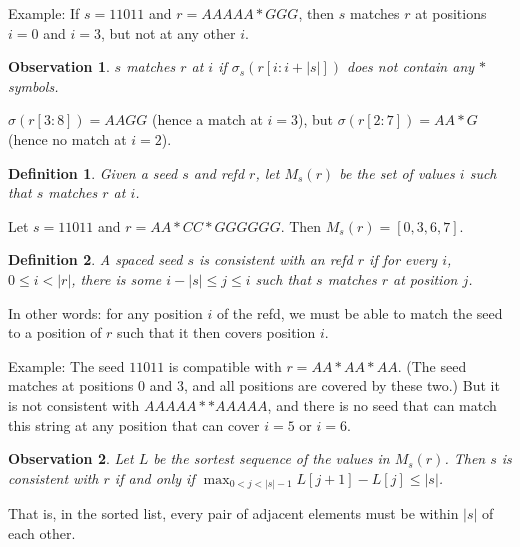 \documentclass{article}
\newtheorem{definition}{Definition}
\newtheorem{observation}{Observation}
\begin{document}
Example: If $s=11011$ and $r = AAAAA*GGG$, then $s$ matches $r$
at positions $i=0$ and $i=3$, but not at any other $i$.


\begin{observation}
$s$ matches $r$ at $i$ if $\sigma_s(r[i:i+|s|])$ does not contain any
  $*$ symbols.
\end{observation}


$\sigma(r[3:8]) = AAGG$ (hence a match at $i=3$), but $\sigma(r[2:7])
= AA*G$ (hence no match at $i=2$).

\begin{definition}
  Given a seed $s$ and refd $r$, let $M_s(r)$ be the set of values $i$
  such that $s$ matches $r$ at $i$.
\end{definition}

Let $s=11011$ and $r = AA*CC*GGGGGG$.  Then $M_s(r) = [0, 3, 6, 7]$.


\begin{definition}
  A spaced seed $s$ is consistent with an refd $r$ if
  for every $i$, $0 \leq i < |r|$, there is some
  $i - |s| \leq j \leq i$ such that $s$ matches $r$ at position $j$.
\end{definition}

In other words: for any position $i$ of the refd, we must be able to
match the seed to a position of $r$ such that it then covers position
$i$.

Example: The seed $11011$ is compatible with $r=AA*AA*AA$.  (The seed
matches at positions 0 and 3, and all positions are covered by these
two.)  But it is not consistent with $AAAAA**AAAAA$, and there is no
seed that can match this string at any position that can cover $i=5$
or $i=6$.

\begin{observation}
  Let $L$ be the sortest sequence of the values in $M_s(r)$.  Then $s$
  is consistent with $r$ if and only if $\max_{0 < j < |s|-1} L[j+1]-L[j] \leq |s|$.
\end{observation}
That is, in the sorted list, every pair of adjacent elements must be
within $|s|$ of each other.
\end{document}
